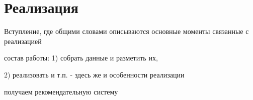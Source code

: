 \section{Реализация}
    Вступление, где общими словами описываются основные моменты связанные с реализацией

     состав работы: 1) собрать данные и  разметить их,

     2) реализовать и т.п. - здесь же и особенности реализации

    получаем рекомендательную систему

    
    
    
    
    
    

